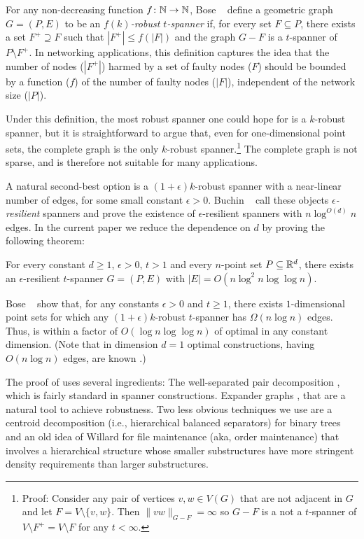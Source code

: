 \documentclass{patmorin}
\begin{document}
For any non-decreasing function $f\colon\mathbb{N}\to\mathbb{N}$, Bose \etal\
\cite{bose.dujmovic.ea:robust} define a geometric graph $G=(P,E)$ to be an
\emph{$f(k)$-robust $t$-spanner} if, for every set $F\subseteq P$,
there exists a set $F^+\supseteq F$ such that $|F^+|\le f(|F|)$ and
the graph $G-F$ is a $t$-spanner of $P\setminus F^+$.  In networking
applications, this definition captures the idea that the number
of nodes ($|F^+|$) harmed by a set of faulty nodes ($F$) should be bounded by a function
($f$) of the number of faulty nodes ($|F|$), independent of the network
size ($|P|$).

Under this definition, the most robust spanner one could hope for
is a $k$-robust spanner, but it is straightforward to argue
that, even for one-dimensional point sets, the complete graph is the
only $k$-robust spanner.\footnote{Proof: Consider any pair of vertices
$v,w\in V(G)$ that are not adjacent in $G$ and let $F=V\setminus\{v,w\}$.
Then $\|vw\|_{G-F}=\infty$ so $G-F$ is a not a $t$-spanner of $V\setminus
F^+=V\setminus F$ for any $t<\infty$.} The complete graph is not sparse,
and is therefore not suitable for many applications.

A natural second-best option is a $(1+\epsilon)k$-robust spanner with
a near-linear number of edges, for some small constant $\epsilon >0$.
Buchin \etal\ \cite{buchin.har-peled.ea:spanner} call these objects
\emph{$\epsilon$-resilient} spanners and prove the existence of
$\epsilon$-resilient spanners with $n\log^{O(d)} n$ edges.
In the current paper we reduce the dependence on $d$ by proving the
following theorem:

\begin{thm}
  For every constant $d\ge 1$, $\epsilon>0$, $t>1$ and every $n$-point
  set $P\subseteq\mathbb{R}^d$, there exists an $\epsilon$-resilient $t$-spanner
  $G=(P,E)$ with $|E|=O(n\log^2 n\log\log n)$.
\end{thm}

Bose \etal\ \cite{bose.dujmovic.ea:robust} show that, for any constants
$\epsilon>0$ and $t\ge 1$, there exists $1$-dimensional point sets
for which any $(1+\epsilon)k$-robust $t$-spanner has $\Omega(n\log
n)$ edges.  Thus, \thmref{main-i} is within a factor of $O(\log
n\log\log n)$ of optimal in any constant dimension.  (Note that in
dimension $d=1$ optimal constructions, having $O(n\log n)$ edges, are
known \cite{buchin.har-peled.ea:spanner}.)

The proof of  uses several ingredients: The well-separated
pair decomposition \cite{callahan.kosaraju:decomposition}, which
is fairly standard in spanner constructions.  Expander graphs
\cite{hoory.linial.ea:expanders}, that are a natural tool to
achieve robustness. Two less obvious techniques we use are a centroid
decomposition (i.e., hierarchical balanced separators) for binary trees
and an old idea of Willard \cite{willard:maintaining} for file maintenance
(aka, order maintenance) that involves a hierarchical structure whose
smaller substructures have more stringent density requirements than
larger substructures.
\end{document}
